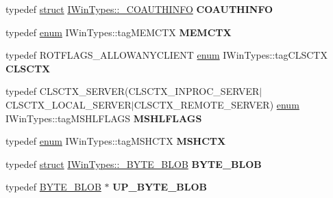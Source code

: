 \begin{DoxyCompactItemize}
\item 
\mbox{\label{interface_i_win_types_aeba8cbe4b7ab148156015c1f86671217}} 
typedef \hyperlink{interfacestruct}{struct} \hyperlink{struct_i_win_types_1_1___c_o_a_u_t_h_i_n_f_o}{I\+Win\+Types\+::\+\_\+\+C\+O\+A\+U\+T\+H\+I\+N\+FO} {\bfseries C\+O\+A\+U\+T\+H\+I\+N\+FO}
\item 
\mbox{\label{interface_i_win_types_aa1849f3031c9990f437a431118c68d2e}} 
typedef \hyperlink{interfaceenum}{enum} I\+Win\+Types\+::tag\+M\+E\+M\+C\+TX {\bfseries M\+E\+M\+C\+TX}
\item 
\mbox{\label{interface_i_win_types_a317c0fe5b504cd94fdbf212a0447cd9b}} 
typedef R\+O\+T\+F\+L\+A\+G\+S\+\_\+\+A\+L\+L\+O\+W\+A\+N\+Y\+C\+L\+I\+E\+NT \hyperlink{interfaceenum}{enum} I\+Win\+Types\+::tag\+C\+L\+S\+C\+TX {\bfseries C\+L\+S\+C\+TX}
\item 
\mbox{\label{interface_i_win_types_a40bb7b45b64babc298c707adf932849c}} 
typedef C\+L\+S\+C\+T\+X\+\_\+\+S\+E\+R\+V\+ER(C\+L\+S\+C\+T\+X\+\_\+\+I\+N\+P\+R\+O\+C\+\_\+\+S\+E\+R\+V\+ER$\vert$C\+L\+S\+C\+T\+X\+\_\+\+L\+O\+C\+A\+L\+\_\+\+S\+E\+R\+V\+ER$\vert$C\+L\+S\+C\+T\+X\+\_\+\+R\+E\+M\+O\+T\+E\+\_\+\+S\+E\+R\+V\+ER) \hyperlink{interfaceenum}{enum} I\+Win\+Types\+::tag\+M\+S\+H\+L\+F\+L\+A\+GS {\bfseries M\+S\+H\+L\+F\+L\+A\+GS}
\item 
\mbox{\label{interface_i_win_types_ad10fbad84b1a453f1ac47a2aece6dffc}} 
typedef \hyperlink{interfaceenum}{enum} I\+Win\+Types\+::tag\+M\+S\+H\+C\+TX {\bfseries M\+S\+H\+C\+TX}
\item 
\mbox{\label{interface_i_win_types_a5d97ce3e259521f1f1c4f5c7d64748cd}} 
typedef \hyperlink{interfacestruct}{struct} \hyperlink{struct_i_win_types_1_1___b_y_t_e___b_l_o_b}{I\+Win\+Types\+::\+\_\+\+B\+Y\+T\+E\+\_\+\+B\+L\+OB} {\bfseries B\+Y\+T\+E\+\_\+\+B\+L\+OB}
\item 
\mbox{\label{interface_i_win_types_a9f65187736c6508e4fe6d1a149ebc7f3}} 
typedef \hyperlink{struct_i_win_types_1_1___b_y_t_e___b_l_o_b}{B\+Y\+T\+E\+\_\+\+B\+L\+OB} $\ast$ {\bfseries U\+P\+\_\+\+B\+Y\+T\+E\+\_\+\+B\+L\+OB}
\item 

\end{DoxyCompactItemize}
